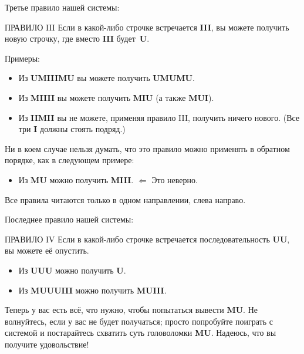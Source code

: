 \documentclass[../main.tex]{subfiles}
\begin{document}
Третье правило нашей системы:

\begin{mybox}{ПРАВИЛО III}
    Если в какой-либо строчке встречается \textbf{III}, вы можете получить новую строчку, где вместо \textbf{III} будет~\textbf{U}.
\end{mybox}

Примеры:

\begin{itemize}[label={}, noitemsep, topsep=6pt, leftmargin=\parindent]
    \item Из \textbf{UMIIIMU} вы можете получить \textbf{UMUMU}.
    \item Из \textbf{MIIII} вы можете получить \textbf{MIU} (а также \textbf{MUI}).
    \item Из \textbf{IIMII} вы не можете, применяя правило III, получить ничего нового. (Все три \textbf{I} должны стоять подряд.)
\end{itemize}

Ни в коем случае нельзя думать, что это правило можно применять в обратном порядке, как в следующем примере:

\begin{itemize}[label={}, noitemsep, topsep=6pt, leftmargin=\parindent]
    \item Из \textbf{MU} можно получить \textbf{MIII}\@. $\Leftarrow$ Это неверно.
\end{itemize}

Все правила читаются только в одном направлении, слева направо.

Последнее правило нашей системы:

\begin{mybox}{ПРАВИЛО IV}
    Если в какой-либо строчке встречается последовательность \textbf{UU}, вы можете её опустить.
\end{mybox}

\begin{itemize}[label={}, noitemsep, topsep=6pt, leftmargin=\parindent]
    \item Из \textbf{UUU} можно получить \textbf{U}.
    \item Из \textbf{MUUUIII} можно получить \textbf{MUIII}.
\end{itemize}

Теперь у вас есть всё, что нужно, чтобы попытаться вывести \textbf{MU}.
Не волнуйтесь, если у вас не будет получаться; просто попробуйте поиграть с системой и постарайтесь схватить суть головоломки \textbf{MU}.
Надеюсь, что вы получите удовольствие!
\end{document}
